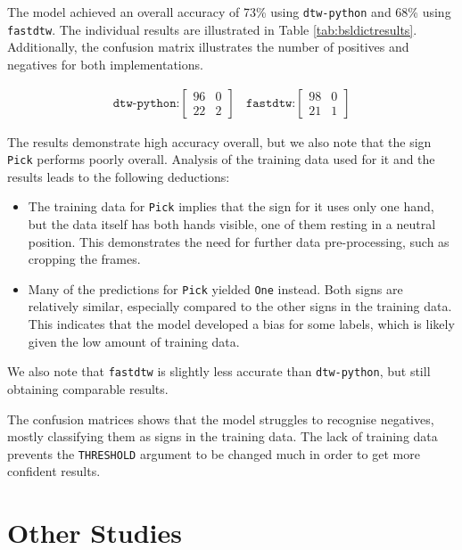 \documentclass[final,rdr32.tex]{subfiles}
\begin{document}
The model achieved an overall accuracy of 73\% using \verb|dtw-python| and 68\% using \verb|fastdtw|. The individual results are illustrated in Table \ref{tab:bsldictresults}. Additionally, the confusion matrix illustrates the number of positives and negatives for both implementations.

\[\begin{aligned}
        \texttt{dtw-python:}
        \begin{bmatrix}
            96 & 0 \\
            22 & 2
        \end{bmatrix}\
        \text{ }
        \texttt{fastdtw:}
        \begin{bmatrix}
            98 & 0 \\
            21 & 1
        \end{bmatrix}
    \end{aligned}\]

The results demonstrate high accuracy overall, but we also note that the sign \verb|Pick| performs poorly overall. Analysis of the training data used for it and the results leads to the following deductions:
\begin{itemize}
    \item The training data for \verb|Pick| implies that the sign for it uses only one hand, but the data itself has both hands visible, one of them resting in a neutral position. This demonstrates the need for further data pre-processing, such as cropping the frames.
    \item Many of the predictions for \verb|Pick| yielded \verb|One| instead. Both signs are relatively similar, especially compared to the other signs in the training data. This indicates that the model developed a bias for some labels, which is likely given the low amount of training data.
\end{itemize}

We also note that \verb|fastdtw| is slightly less accurate than \verb|dtw-python|, but still obtaining comparable results.

The confusion matrices shows that the model struggles to recognise negatives, mostly classifying them as signs in the training data. The lack of training data prevents the \verb|THRESHOLD| argument to be changed much in order to get more confident results.
\section{Other Studies}
\end{document}

